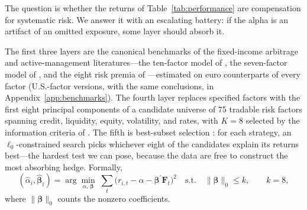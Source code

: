 
The question is whether the returns of Table~\ref{tab:performance} are
compensation for systematic risk. We answer it with an escalating battery: if
the alpha is an artifact of an omitted exposure, some layer should absorb it.

The first three layers are the canonical benchmarks of the fixed-income
arbitrage and active-management literatures---the ten-factor model of
\citet{duarte2007risk}, the seven-factor model of \citet{fung2004hedge}, and
the eight risk premia of \citet{brooks2020active}---estimated on euro
counterparts of every factor (U.S.-factor versions, with the same conclusions,
in Appendix~\ref{app:benchmarks}). The fourth layer replaces specified factors
with the first eight principal components of a candidate universe of 75
tradable risk factors spanning credit, liquidity, equity, volatility, and
rates, with $K=8$ selected by the information criteria of
\citet{bai2002determining}. The fifth is best-subset selection \citep{bertsimas2016best}: for each
strategy, an $\ell_0$-constrained search picks whichever eight of the
candidates explain its returns best---the hardest test we can pose, because
the data are free to construct the most absorbing hedge. Formally,
\begin{equation}
(\hat\alpha_i,\hat{\boldsymbol\beta}_i)=\arg\min_{\alpha,\,\boldsymbol\beta}\;
\sum_{t}\bigl(r_{i,t}-\alpha-\boldsymbol\beta^{\prime}\mathbf{F}_t\bigr)^{2}
\quad\text{s.t.}\quad \lVert\boldsymbol\beta\rVert_0\le k,\qquad k=8,
\end{equation}
where $\lVert\boldsymbol\beta\rVert_0$ counts the nonzero coefficients.

